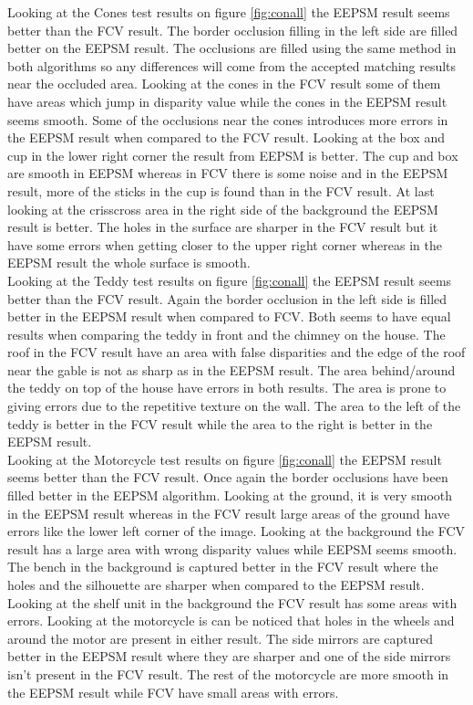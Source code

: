 Looking at the Cones test results on figure \vref{fig:conall} the EEPSM result seems better than the FCV result. The border occlusion filling in the left side are filled better on the EEPSM result. The occlusions are filled using the same method in both algorithms so any differences will come from the accepted matching results near the occluded area. Looking at the cones in the FCV result some of them have areas which jump in disparity value while the cones in the EEPSM result seems smooth. Some of the occlusions near the cones introduces more errors in the EEPSM result when compared to the FCV result. Looking at the box and cup in the lower right corner the result from EEPSM is better. The cup and box are smooth in EEPSM whereas in FCV there is some noise and in the EEPSM result, more of the sticks in the cup is found than in the FCV result. At last looking at the crisscross area in the right side of the background the EEPSM result is better. The holes in the surface are sharper in the FCV result but it have some errors when getting closer to the upper right corner whereas in the EEPSM result the whole surface is smooth.\\

Looking at the Teddy test results on figure \vref{fig:conall} the EEPSM result seems better than the FCV result. Again the border occlusion in the left side is filled better in the EEPSM result when compared to FCV. Both seems to have equal results when comparing the teddy in front and the chimney on the house. The roof in the FCV result have an area with false disparities and the edge of the roof near the gable is not as sharp as in the EEPSM result. The area behind/around the teddy on top of the house have errors in both results. The area is prone to giving errors due to the repetitive texture on the wall. The area to the left of the teddy is better in the FCV result while the area to the right is better in the EEPSM result.\\

Looking at the Motorcycle test results on figure \vref{fig:conall} the EEPSM result seems better than the FCV result. Once again the border occlusions have been filled better in the EEPSM algorithm. Looking at the ground, it is very smooth in the EEPSM result whereas in the FCV result large areas of the ground have errors like the lower left corner of the image. Looking at the background the FCV result has a large area with wrong disparity values while EEPSM seems smooth. The bench in the background is captured better in the FCV result where the holes and the silhouette are sharper when compared to the EEPSM result. Looking at the shelf unit in the background the FCV result has some areas with errors. Looking at the motorcycle is can be noticed that holes in the wheels and around the motor are present in either result. The side mirrors are captured better in the EEPSM result where they are sharper and one of the side mirrors isn't present in the FCV result. The rest of the motorcycle are more smooth in the EEPSM result while FCV have small areas with errors.\\

